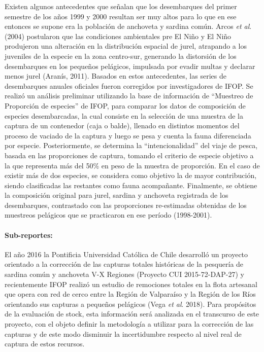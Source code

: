 \documentclass[
  spanish,
]{article}
\begin{document}
Existen algunos antecedentes que señalan que los desembarques del primer
semestre de los años 1999 y 2000 resultan ser muy altos para lo que en
ese entonces se supone era la población de anchoveta y sardina común.
Arcos \emph{et al}. (2004) postularon que las condiciones ambientales
pre El Niño y El Niño produjeron una alteración en la distribución
espacial de jurel, atrapando a los juveniles de la especie en la zona
centro-sur, generando la distorsión de los desembarques en los pequeños
pelágicos, impulsada por evadir multas y declarar menos jurel (Aranís,
2011). Basados en estos antecedentes, las series de desembarques anuales
oficiales fueron corregidos por investigadores de IFOP. Se realizó un
análisis preliminar utilizando la base de información de ``Muestreo de
Proporción de especies'' de IFOP, para comparar los datos de composición
de especies desembarcadas, la cual consiste en la selección de una
muestra de la captura de un contenedor (caja o balde), llenado en
distintos momentos del proceso de vaciado de la captura y luego se pesa
y cuenta la fauna diferenciada por especie. Posteriormente, se determina
la ``intencionalidad'' del viaje de pesca, basada en las proporciones de
captura, tomando el criterio de especie objetivo a la que representa más
del 50\% en peso de la muestra de proporción. En el caso de existir más
de dos especies, se considera como objetivo la de mayor contribución,
siendo clasificadas las restantes como fauna acompañante. Finalmente, se
obtiene la composición original para jurel, sardina y anchoveta
registrada de los desembarques, contrastado con las proporciones
re-estimadas obtenidas de los muestreos pelágicos que se practicaron en
ese período (1998-2001).

\hypertarget{sub-reportes}{%
\paragraph{Sub-reportes:}\label{sub-reportes}}

El año 2016 la Pontificia Universidad Católica de Chile desarrolló un
proyecto orientado a la corrección de las capturas totales históricas de
la pesquería de sardina común y anchoveta V-X Regiones (Proyecto CUI
2015-72-DAP-27) y recientemente IFOP realizó un estudio de remociones
totales en la flota artesanal que opera con red de cerco entre la Región
de Valparaíso y la Región de los Ríos orientando sus capturas a pequeños
pelágicos (Vega \emph{et al}. 2018). Para propósitos de la evaluación de
stock, esta información será analizada en el transcurso de este
proyecto, con el objeto definir la metodología a utilizar para la
corrección de las capturas y de este modo disminuir la incertidumbre
respecto al nivel real de captura de estos recursos.
\end{document}
